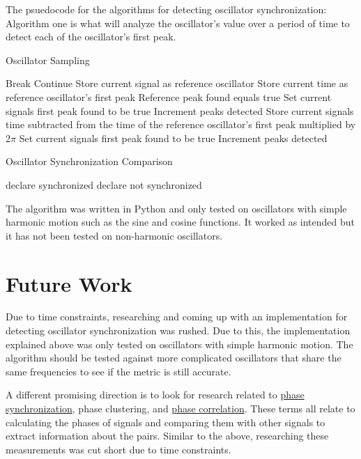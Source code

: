\documentclass{article}
\begin{document}
The psuedocode for the algorithms for detecting oscillator synchronization:
Algorithm one is what will analyze the oscillator's value over a period of time to detect each of the oscillator's first peak. 
\begin{algorithm}[H]
	\caption{Oscillator Sampling}
	\begin{algorithmic}[1]
		\State Break
		\EndIf
		\State Continue
		\EndIf
		\State Store current signal as reference oscillator
		\State Store current time as reference oscillator's first peak
		\State Reference peak found equals true
		\State Set current signals first peak found to be true
		\State Increment peaks detected
		\Else
		\State Store current signals time subtracted from the time of the reference oscillator's first peak 
		\State multiplied by 2$\pi$
		\State Set current signals first peak found to be true
		\State Increment peaks detected
		\EndIf
		\EndIf
		\EndFor
		\EndFor
	\end{algorithmic} 
\end{algorithm} 

\begin{algorithm}[H]
	\caption{Oscillator Synchronization Comparison}
	\begin{algorithmic}[1]
		\State declare synchronized
		\Else
		\State declare not synchronized
		\EndIf 
		\EndFor
		\EndFor
	\end{algorithmic} 
\end{algorithm} 

The algorithm was written in Python and only tested on oscillators with simple harmonic motion such as the sine and cosine functions. It worked as intended but it has not been tested on non-harmonic oscillators.

\section{Future Work}
Due to time constraints, researching and coming up with an implementation for detecting oscillator synchronization was rushed. Due to this, the implementation explained above was only tested on oscillators with simple harmonic motion. The algorithm should be tested against more complicated oscillators that share the same frequencies to see if the metric is still accurate.

A different promising direction is to look for research related to \href{https://en.wikipedia.org/wiki/Phase_synchronization}{phase synchronization}, phase clustering, and \href{https://en.wikipedia.org/wiki/Phase_correlation}{phase correlation}. These terms all relate to calculating the phases of signals and comparing them with other signals to extract information about the pairs. Similar to the above, researching these measurements was cut short due to time constraints.



\end{document}
